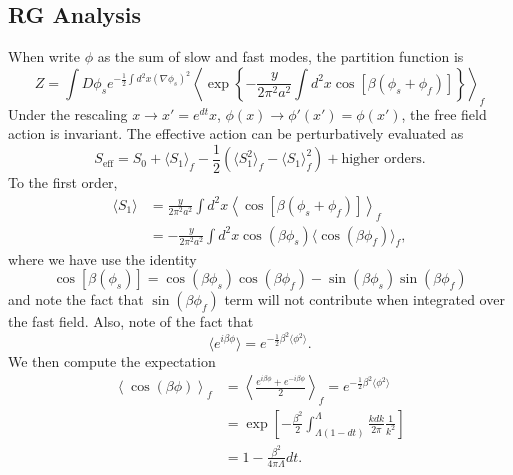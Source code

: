 \documentclass[aps,prb,superscriptaddress,nofootinbib]{revtex4}
\begin{document}
\subsection{RG Analysis}
When write $\phi$ as the sum of slow and fast modes, the partition function is
\begin{equation}
	Z = \int D\phi_s e^{-\frac{1}{2}\int d^2x (\nabla\phi_s)^2}
	\left\langle\exp\left\{-\frac{y}{2\pi^2 a^2} \int d^2 x \cos\left[\beta(\phi_s+\phi_f)\right] \right\}\right\rangle_f
\end{equation}
Under the rescaling $x \rightarrow x' = e^{dt} x$, $\phi(x) \rightarrow \phi'(x') = \phi(x')$, the free field action is invariant.
The effective action can be perturbatively evaluated as
\begin{equation}
	S_{\mathrm{eff}} = S_0 + \langle S_1\rangle_f - \frac{1}{2}(\langle S_1^2\rangle_f - \langle S_1\rangle_f^2) + \text{higher orders}.
\end{equation}
To the first order, 
\begin{equation}
\begin{aligned}
	\langle S_1\rangle &= \frac{y}{2\pi^2 a^2} \int d^2 x \left\langle\cos\left[\beta(\phi_s+\phi_f)\right] \right\rangle_f \\
	&= -\frac{y}{2\pi^2 a^2} \int d^2 x \cos(\beta\phi_s)\langle\cos(\beta\phi_f)\rangle_f,
\end{aligned}
\end{equation}
where we have use the identity
\begin{equation}
	\cos\left[\beta(\phi_s)\right]
	= \cos(\beta\phi_s)\cos(\beta\phi_f)-\sin(\beta\phi_s)\sin(\beta\phi_f)
\end{equation}
and note the fact that $\sin(\beta\phi_f)$ term will not contribute when integrated over the fast field. 
Also, note of the fact that
\begin{equation}
	\langle e^{i\beta\phi}\rangle = e^{-\frac{1}{2}\beta^2 \langle\phi^2\rangle}.
\end{equation}
We then compute the expectation
\begin{equation}
\begin{aligned}
	\left\langle \cos(\beta\phi)\right\rangle_f
	&= \left\langle \frac{e^{i\beta\phi} + e^{-i\beta\phi}}{2}\right\rangle_f
	= e^{-\frac{1}{2}\beta^2\langle\phi^2\rangle} \\
	&= \exp\left[-\frac{\beta^2}{2}\int^\Lambda_{\Lambda(1-dt)}\frac{k dk}{2\pi} \frac{1}{k^2} \right] \\
	&= 1-\frac{\beta^2}{4\pi\Lambda}dt.
\end{aligned}
\end{equation}
\end{document}
